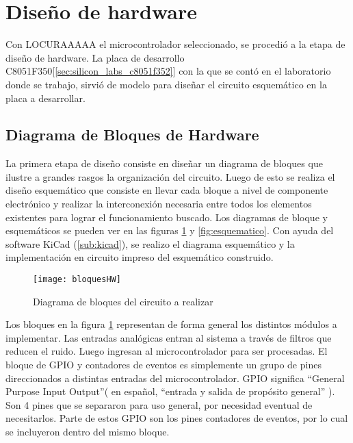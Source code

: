 \section{Diseño de hardware} %
\label{sec:diseno_de_hardware}




Con LOCURAAAAA el microcontrolador seleccionado, se procedió a la etapa de diseño de hardware. La placa de desarrollo C8051F350[\ref{sec:silicon_labs_c8051f352}] con la que se contó en el laboratorio donde se trabajo, sirvió de modelo para diseñar el circuito esquemático en la placa a desarrollar.

\subsection{Diagrama de Bloques de Hardware} %
\label{sub:diagrama_de_bloques_de_hardware}

La primera etapa de diseño consiste en diseñar un diagrama de bloques que ilustre a grandes rasgos la organización del circuito. Luego de esto se realiza el diseño esquemático que consiste en llevar cada bloque a nivel de componente electrónico y realizar la interconexión necesaria entre todos los elementos existentes para lograr el funcionamiento buscado. Los diagramas de bloque y esquemáticos se pueden ver en las figuras \ref{fig:bloquesHW} y \ref{fig:esquematico}. Con ayuda del software KiCad (\ref{sub:kicad}), se realizo el diagrama esquemático y la implementación en circuito impreso del esquemático construido.

\begin{figure}[/h]
  \centering
  \texttt{[image: bloquesHW]}
  \caption{\small Diagrama de bloques del circuito a realizar}\label{fig:bloquesHW}
\end{figure}

Los bloques en la figura \ref{fig:bloquesHW} representan de forma general los distintos módulos a implementar. Las entradas analógicas entran al sistema a través de filtros que reducen el ruido. Luego ingresan al microcontrolador para ser procesadas. El bloque de GPIO y contadores de eventos es simplemente un grupo de pines direccionados a distintas entradas del microcontrolador. GPIO significa ``General Purpose Input Output''( en español, ``entrada y salida de propósito general'' ). Son 4 pines que se separaron para uso general, por necesidad eventual de necesitarlos. Parte de estos GPIO son los pines contadores de eventos, por lo cual se incluyeron dentro del mismo bloque.

